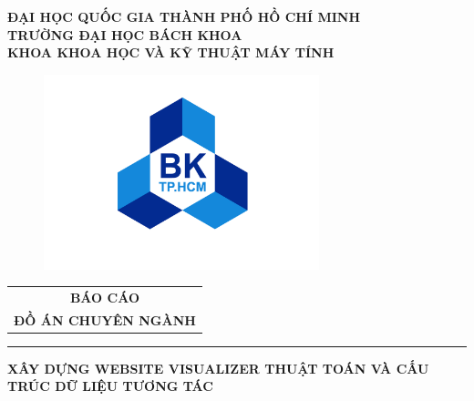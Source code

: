 \documentclass[a4paper]{report}
\begin{document}
\begin{titlepage}
\vspace{-2.cm}
\begin{center}
\large \textbf{\fontsize{14pt}{0pt}\selectfont ĐẠI HỌC QUỐC GIA THÀNH PHỐ HỒ CHÍ MINH} \\
\Large \textbf{\fontsize{14pt}{0pt}\selectfont TRƯỜNG ĐẠI HỌC BÁCH KHOA} \\
\Large \textbf{\fontsize{14pt}{0pt}\selectfont KHOA KHOA HỌC VÀ KỸ THUẬT MÁY TÍNH}
\end{center}

\vspace{0.3cm}

\begin{figure}[h!]
\begin{center}
\includegraphics[width=8cm]{images/hcmut.png}
\end{center}
\end{figure}
\vspace{-1cm}
\begin{center}
\begin{tabular}{c}
\multicolumn{1}{c}{\textbf{{\Large BÁO CÁO}}}
\\{\textbf{{\Large \MakeUppercase{ĐỒ ÁN CHUYÊN NGÀNH}}}}
\\

\end{tabular}
\end{center}
\rule[0.4cm]{\linewidth}{0.3mm} 
\centering
{\Large \bfseries \MakeUppercase{XÂY DỰNG WEBSITE VISUALIZER THUẬT TOÁN VÀ CẤU TRÚC DỮ LIỆU TƯƠNG TÁC}}    


\end{titlepage}
\end{document}

